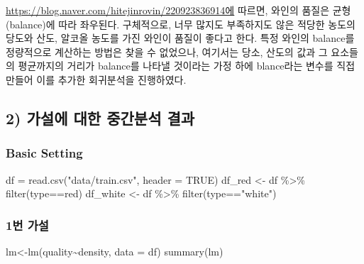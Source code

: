 \documentclass[
]{article}
\newenvironment{Shaded}{\begin{snugshade}}{\end{snugshade}}
\newcommand{\AttributeTok}[1]{\textcolor[rgb]{0.77,0.63,0.00}{#1}}
\newcommand{\ConstantTok}[1]{\textcolor[rgb]{0.00,0.00,0.00}{#1}}
\newcommand{\FunctionTok}[1]{\textcolor[rgb]{0.00,0.00,0.00}{#1}}
\newcommand{\NormalTok}[1]{#1}
\newcommand{\OtherTok}[1]{\textcolor[rgb]{0.56,0.35,0.01}{#1}}
\newcommand{\SpecialCharTok}[1]{\textcolor[rgb]{0.00,0.00,0.00}{#1}}
\newcommand{\StringTok}[1]{\textcolor[rgb]{0.31,0.60,0.02}{#1}}
\begin{document}
\url{https://blog.naver.com/hitejinrovin/220923836914에} 따르면, 와인의
품질은 균형(balance)에 따라 좌우된다. 구체적으로, 너무 많지도 부족하지도
않은 적당한 농도의 당도와 산도, 알코올 농도를 가진 와인이 품질이 좋다고
한다. 특정 와인의 balance를 정량적으로 계산하는 방법은 찾을 수 없었으나,
여기서는 당소, 산도의 값과 그 요소들의 평균까지의 거리가 balance를
나타낼 것이라는 가정 하에 blance라는 변수를 직접 만들어 이를 추가한
회귀분석을 진행하였다.

\hypertarget{uxac00uxc124uxc5d0-uxb300uxd55c-uxc911uxac04uxbd84uxc11d-uxacb0uxacfc}{%
\subsection{2) 가설에 대한 중간분석
결과}\label{uxac00uxc124uxc5d0-uxb300uxd55c-uxc911uxac04uxbd84uxc11d-uxacb0uxacfc}}

\hypertarget{basic-setting}{%
\subsubsection{Basic Setting}\label{basic-setting}}

\begin{Shaded}
\begin{Highlighting}[]
\NormalTok{df }\OtherTok{=} \FunctionTok{read.csv}\NormalTok{(}\StringTok{"data/train.csv"}\NormalTok{, }\AttributeTok{header =} \ConstantTok{TRUE}\NormalTok{)}
\NormalTok{df\_red }\OtherTok{\textless{}{-}}\NormalTok{ df }\SpecialCharTok{\%\textgreater{}\%} \FunctionTok{filter}\NormalTok{(type}\SpecialCharTok{==}\StringTok{\textquotesingle{}red\textquotesingle{}}\NormalTok{)}
\NormalTok{df\_white }\OtherTok{\textless{}{-}}\NormalTok{ df }\SpecialCharTok{\%\textgreater{}\%} \FunctionTok{filter}\NormalTok{(type}\SpecialCharTok{==}\StringTok{"white"}\NormalTok{)}
\end{Highlighting}
\end{Shaded}

\hypertarget{uxbc88-uxac00uxc124}{%
\subsubsection{1번 가설}\label{uxbc88-uxac00uxc124}}

\begin{Shaded}
\begin{Highlighting}[]
\NormalTok{lm}\OtherTok{\textless{}{-}}\FunctionTok{lm}\NormalTok{(quality}\SpecialCharTok{\textasciitilde{}}\NormalTok{density, }\AttributeTok{data =}\NormalTok{ df)}
\FunctionTok{summary}\NormalTok{(lm)}
\end{Highlighting}
\end{Shaded}
\end{document}
